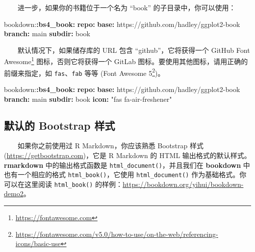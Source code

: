 \documentclass[
  12pt,
]{krantz}
\newenvironment{Shaded}{\begin{snugshade}}{\end{snugshade}}
\newcommand{\AttributeTok}[1]{\textcolor[rgb]{0.13,0.29,0.53}{#1}}
\newcommand{\FunctionTok}[1]{\textcolor[rgb]{0.13,0.29,0.53}{\textbf{#1}}}
\newcommand{\KeywordTok}[1]{\textcolor[rgb]{0.13,0.29,0.53}{\textbf{#1}}}
\newcommand{\StringTok}[1]{\textcolor[rgb]{0.31,0.60,0.02}{#1}}
\renewcommand{\href}[2]{#2\footnote{\url{#1}}}
\theoremstyle{definition}
\theoremstyle{definition}
\theoremstyle{definition}
\theoremstyle{definition}
\theoremstyle{remark}
\begin{document}
  进一步，如果你的书籍位于一个名为 ``book'' 的子目录中，你可以使用：

\begin{Shaded}
\begin{Highlighting}[]
\AttributeTok{bookdown:}\FunctionTok{:bs4\_book}\KeywordTok{:}
\AttributeTok{  }\FunctionTok{repo}\KeywordTok{:}
\AttributeTok{    }\FunctionTok{base}\KeywordTok{:}\AttributeTok{ https://github.com/hadley/ggplot2{-}book}
\AttributeTok{    }\FunctionTok{branch}\KeywordTok{:}\AttributeTok{ main}
\AttributeTok{    }\FunctionTok{subdir}\KeywordTok{:}\AttributeTok{ book}
\end{Highlighting}
\end{Shaded}

  默认情况下，如果储存库的 URL 包含 ``github''，它将获得一个 GitHub \href{https://fontawesome.com}{Font Awesome} 图标，否则它将获得一个 GitLab 图标。要使用其他图标，请用正确的前缀来指定，如 \texttt{fas}、\texttt{fab} 等等 (\href{https://fontawesome.com/v5.0/how-to-use/on-the-web/referencing-icons/basic-use}{Font Awesome 5})。

\begin{Shaded}
\begin{Highlighting}[]
\AttributeTok{bookdown:}\FunctionTok{:bs4\_book}\KeywordTok{:}
\AttributeTok{  }\FunctionTok{repo}\KeywordTok{:}
\AttributeTok{    }\FunctionTok{base}\KeywordTok{:}\AttributeTok{ https://github.com/hadley/ggplot2{-}book}
\AttributeTok{    }\FunctionTok{branch}\KeywordTok{:}\AttributeTok{ main}
\AttributeTok{    }\FunctionTok{subdir}\KeywordTok{:}\AttributeTok{ book}
\AttributeTok{    }\FunctionTok{icon}\KeywordTok{:}\AttributeTok{ }\StringTok{"fas fa{-}air{-}freshener"}
\end{Highlighting}
\end{Shaded}

\hypertarget{bootstrap-style}{%
\subsection{默认的 Bootstrap 样式}\label{bootstrap-style}}

  如果你之前使用过 R Markdown，你应该熟悉 Bootstrap 样式 (\url{https://getbootstrap.com})，它是 R Markdown 的 HTML 输出格式的默认样式。\textbf{rmarkdown} 中的输出格式函数是 \texttt{html\_document()}，并且我们在 \textbf{bookdown} 中也有一个相应的格式 \texttt{html\_book()}，它使用 \texttt{html\_document()} 作为基础格式。你可以在这里阅读 \texttt{html\_book()} 的样例：\url{https://bookdown.org/yihui/bookdown-demo2}。
\end{document}
